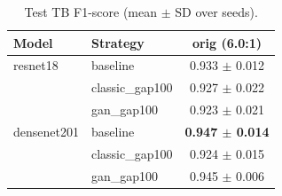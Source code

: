 \begin{table}[htbp]
\centering
\caption{Test TB F1-score (mean $\pm$ SD over seeds).}
\label{tab:tb_f1}
\begin{tabular}{llc}
\toprule
Model & Strategy & orig (6.0:1) \\
\midrule
resnet18 & baseline & 0.933 $\pm$ 0.012 \\
 & classic\_gap100 & 0.927 $\pm$ 0.022 \\
 & gan\_gap100 & 0.923 $\pm$ 0.021 \\
\addlinespace
densenet201 & baseline & \textbf{0.947 $\pm$ 0.014} \\
 & classic\_gap100 & 0.924 $\pm$ 0.015 \\
 & gan\_gap100 & 0.945 $\pm$ 0.006 \\
\bottomrule
\end{tabular}
\end{table}